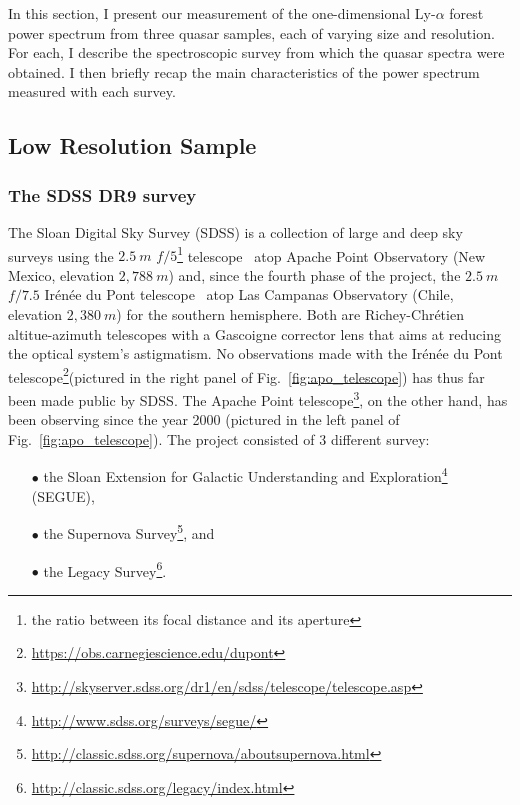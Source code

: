 \vspace*{1.5pc}

In this section, I present our measurement of the one-dimensional Ly-$\alpha$ forest power spectrum from three quasar samples, each of varying size and resolution. For each, I describe the spectroscopic survey from which the quasar spectra were obtained. I then briefly recap the main characteristics of the power spectrum measured with each survey. 

\subsection{Low Resolution Sample}
\label{sec:lrs}

\subsubsection{The SDSS DR9 survey}

The Sloan Digital Sky Survey (SDSS) is a collection of large and deep sky surveys using the $2.5~m$ $f/5$\footnote{the ratio between its focal distance and its aperture} telescope~\citep{Gunn2006} atop Apache Point Observatory (New Mexico, elevation $2,788~m$) and, since the fourth phase of the project, the $2.5~m$ $f/7.5$ Ir\'en\'ee du Pont telescope~\citep{Bowen73} atop Las Campanas Observatory (Chile, elevation $2,380~m$) for the southern hemisphere. Both are Richey-Chr\'etien altitue-azimuth telescopes with a Gascoigne corrector lens that aims at reducing the optical system's astigmatism. No observations made with the Ir\'en\'ee du Pont telescope\footnote{\url{https://obs.carnegiescience.edu/dupont}}(pictured in the right panel of Fig.~\ref{fig:apo_telescope}) has thus far been made public by SDSS. The Apache Point telescope\footnote{\url{http://skyserver.sdss.org/dr1/en/sdss/telescope/telescope.asp}}, on the other hand, has been observing since the year 2000 (pictured in the left panel of Fig.~\ref{fig:apo_telescope}). The project consisted of $3$ different survey: \\

\begin{itemize}
\item[$\bullet$] the Sloan Extension for Galactic Understanding and Exploration\footnote{\url{http://www.sdss.org/surveys/segue/}} (SEGUE), \\
\item[$\bullet$] the Supernova Survey\footnote{\url{http://classic.sdss.org/supernova/aboutsupernova.html}}, and \\
\item[$\bullet$] the Legacy Survey\footnote{\url{http://classic.sdss.org/legacy/index.html}}.\\
\end{itemize}

